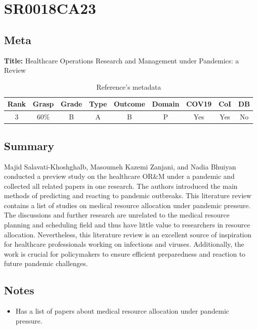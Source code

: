 \section{ SR0018CA23 }


\subsection{Meta}

    \textbf{Title:}
    Healthcare Operations Research and Management under Pandemics: a Review

    \begin{table}[H]
        \centering
        \begin{tabular}{|c|c|c|c|c|c|c|c|c|}
            \hline
                \textbf{Rank} & \textbf{Grasp} & \textbf{Grade} & \textbf{Type} & \textbf{Outcome} & \textbf{Domain} & \textbf{COV19} & \textbf{CoI} & \textbf{DB} \\
            \hline
                3 & 60\% & B & A & B & P & Yes & Yes & No \\
            \hline
        \end{tabular}
        \caption{Reference's metadata}
        \label{tab:SR0018CA23}
    \end{table}

\subsection{Summary}
    Majid Salavati-Khoshghalb, Masoumeh Kazemi Zanjani, and Nadia Bhuiyan \cite{x128} conducted a preview study on the healthcare OR\&M under a pandemic and collected all related papers in one research. The authors introduced the main methods of predicting and reacting to pandemic outbreaks. This literature review contains a list of studies on medical resource allocation under pandemic pressure. The discussions and further research are unrelated to the medical resource planning and scheduling field and thus have little value to researchers in resource allocation. Nevertheless, this literature review is an excellent source of inspiration for healthcare professionals working on infections and viruses. Additionally, the work is crucial for policymakers to ensure efficient preparedness and reaction to future pandemic challenges.

\subsection{Notes}
    \begin{itemize}
        \item Has a list of papers about medical resource allocation under pandemic pressure.
    \end{itemize}


